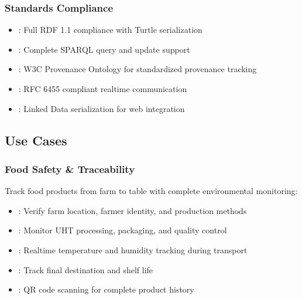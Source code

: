 \documentclass[letterpaper,10pt,english]{sphinxmanual}
\begin{document}
\subsubsection{Standards Compliance}
\label{\detokenize{overview/index:standards-compliance}}\begin{itemize}
\item {} 
\sphinxAtStartPar
{}: Full RDF 1.1 compliance with Turtle serialization

\item {} 
\sphinxAtStartPar
{}: Complete SPARQL query and update support

\item {} 
\sphinxAtStartPar
{}: W3C Provenance Ontology for standardized provenance tracking

\item {} 
\sphinxAtStartPar
{}: RFC 6455 compliant real\sphinxhyphen{}time communication

\item {} 
\sphinxAtStartPar
{}: Linked Data serialization for web integration

\end{itemize}


\subsection{Use Cases}
\label{\detokenize{overview/index:use-cases}}

\subsubsection{Food Safety \& Traceability}
\label{\detokenize{overview/index:food-safety-traceability}}
\sphinxAtStartPar
Track food products from farm to table with complete environmental monitoring:
\begin{itemize}
\item {} 
\sphinxAtStartPar
{}: Verify farm location, farmer identity, and production methods

\item {} 
\sphinxAtStartPar
{}: Monitor UHT processing, packaging, and quality control

\item {} 
\sphinxAtStartPar
{}: Real\sphinxhyphen{}time temperature and humidity tracking during transport

\item {} 
\sphinxAtStartPar
{}: Track final destination and shelf life

\item {} 
\sphinxAtStartPar
{}: QR code scanning for complete product history

\end{itemize}
\end{document}
